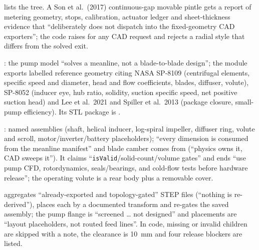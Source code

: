 \textbf{} lists the  tree. A Son et al.\ (2017) continuous-gap movable pintle gets a report of metering geometry, stops, calibration, actuator ledger and sheet-thickness evidence that ``deliberately does not dispatch into the fixed-geometry CAD exporters''; the code raises  for any CAD request and rejects a radial style that differs from the solved exit.

\textbf{}: the pump model ``solves a meanline, not a blade-to-blade design''; the module exports labelled reference geometry citing NASA SP-8109 (centrifugal elements, specific speed and diameter, head and flow coefficients, blades, diffuser, volute), SP-8052 (inducer eye, hub ratio, solidity, suction specific speed, net positive suction head) and Lee et al.\ 2021 and Spiller et al.\ 2013 (package closure, small-pump efficiency). Its STL package is .

\textbf{}: named assemblies (shaft, helical inducer, log-spiral impeller, diffuser ring, volute and scroll, motor/inverter/battery placeholders); ``every dimension is consumed from the meanline manifest'' and blade camber comes from  (``physics owns it, CAD sweeps it''). It claims ``\texttt{isValid}/solid-count/volume gates'' and ends ``use pump CFD, rotordynamics, seals/bearings, and cold-flow tests before hardware release''; the operating volute is a rear body plus a removable cover.

\textbf{} aggregates ``already-exported and topology-gated'' STEP files (``nothing is re-derived''), places each by a documented transform and re-gates the saved assembly; the pump flange is ``screened \ldots{} not designed'' and placements are ``layout placeholders, not routed feed lines''. In code, missing or invalid children are skipped with a note, the clearance is 10~mm and four release blockers are listed.

